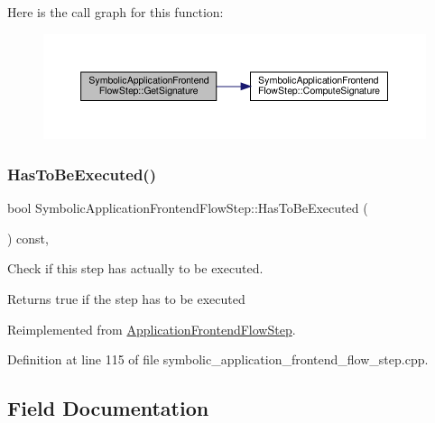 Here is the call graph for this function\+:
\nopagebreak
\begin{figure}[H]
\begin{center}
\leavevmode
\includegraphics[width=350pt]{d5/dad/classSymbolicApplicationFrontendFlowStep_a556a719569a45bfc5f3554c1cc7558c3_cgraph}
\end{center}
\end{figure}
\mbox{\label{classSymbolicApplicationFrontendFlowStep_a113fcb0dca5cdd6e2be02252be23b0e7}} 
\subsubsection{\texorpdfstring{Has\+To\+Be\+Executed()}{HasToBeExecuted()}}
{\footnotesize\ttfamily bool Symbolic\+Application\+Frontend\+Flow\+Step\+::\+Has\+To\+Be\+Executed (\begin{DoxyParamCaption}{ }\end{DoxyParamCaption}) const\hspace{0.3cm}{\ttfamily [override]}, {\ttfamily [virtual]}}



Check if this step has actually to be executed. 

\begin{DoxyReturn}{Returns}
true if the step has to be executed 
\end{DoxyReturn}


Reimplemented from \hyperlink{classApplicationFrontendFlowStep_ad99f4dcbab470c65eea79ae0291a4bd5}{Application\+Frontend\+Flow\+Step}.



Definition at line 115 of file symbolic\+\_\+application\+\_\+frontend\+\_\+flow\+\_\+step.\+cpp.



\subsection{Field Documentation}
\mbox{\label{classSymbolicApplicationFrontendFlowStep_ae156dc307ce4e73c6afe75383460e557}} 
